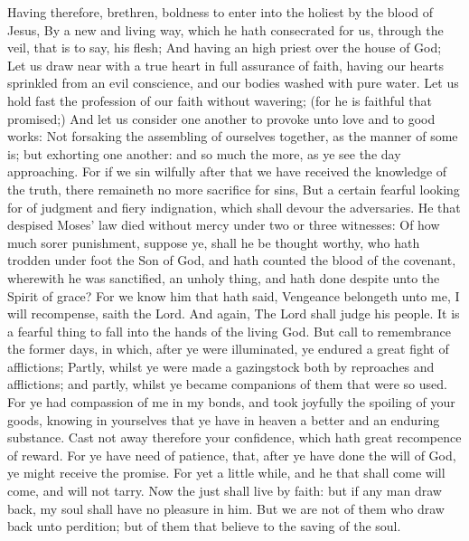  Having therefore, brethren, boldness to enter into the
holiest by the blood of Jesus,  By a new and living way,
which he hath consecrated for us, through the veil, that is to say, his
flesh;  And having an high priest over the house of God;
 Let us draw near with a true heart in full assurance of
faith, having our hearts sprinkled from an evil conscience, and our
bodies washed with pure water.  Let us hold fast the
profession of our faith without wavering; (for he is faithful that
promised;)  And let us consider one another to provoke
unto love and to good works:  Not forsaking the
assembling of ourselves together, as the manner of some is; but
exhorting one another: and so much the more, as ye see the day
approaching.  For if we sin wilfully after that we have
received the knowledge of the truth, there remaineth no more sacrifice
for sins,  But a certain fearful looking for of judgment
and fiery indignation, which shall devour the adversaries.
 He that despised Moses' law died without mercy under two
or three witnesses:  Of how much sorer punishment,
suppose ye, shall he be thought worthy, who hath trodden under foot the
Son of God, and hath counted the blood of the covenant, wherewith he was
sanctified, an unholy thing, and hath done despite unto the Spirit of
grace?  For we know him that hath said, Vengeance
belongeth unto me, I will recompense, saith the Lord. And again, The
Lord shall judge his people.  It is a fearful thing to
fall into the hands of the living God.  But call to
remembrance the former days, in which, after ye were illuminated, ye
endured a great fight of afflictions;  Partly, whilst ye
were made a gazingstock both by reproaches and afflictions; and partly,
whilst ye became companions of them that were so used. 
For ye had compassion of me in my bonds, and took joyfully the spoiling
of your goods, knowing in yourselves that ye have in heaven a better and
an enduring substance.  Cast not away therefore your
confidence, which hath great recompence of reward.  For
ye have need of patience, that, after ye have done the will of God, ye
might receive the promise.  For yet a little while, and
he that shall come will come, and will not tarry.  Now
the just shall live by faith: but if any man draw back, my soul shall
have no pleasure in him.  But we are not of them who draw
back unto perdition; but of them that believe to the saving of the soul.

